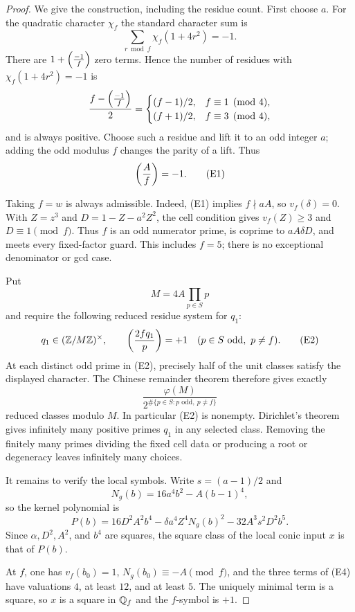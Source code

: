 \begin{proof}
We give the construction, including the residue count.  First choose $a$.
For the quadratic character $\chi_f$ the standard character sum is
\[
 \sum_{r\bmod f}\chi_f(1+4r^2)=-1.
\]
There are \(1+\left(\frac{-1}{f}\right)\) zero terms.  Hence the number of residues
with $\chi_f(1+4r^2)=-1$ is
\[
 \frac{f-\left(\frac{-1}{f}\right)}{2}
 =
 \begin{cases}
 (f-1)/2,&f\equiv1\pmod4,\\
 (f+1)/2,&f\equiv3\pmod4,
 \end{cases}
\]
and is always positive.  Choose such a residue and lift it to an odd
integer $a$; adding the odd modulus $f$ changes the parity of a lift.  Thus
\[
 \left(\frac{A}{f}\right)=-1. \tag{E1}
\]

Taking $f=w$ is always admissible.  Indeed, (E1) implies
$f\nmid aA$, so $v_f(\delta)=0$.  With $Z=z^3$ and
$D=1-Z-a^2Z^2$, the cell condition gives $v_f(Z)\geq3$ and
$D\equiv1\pmod f$.  Thus $f$ is an odd numerator prime, is coprime to
$aA\delta D$, and meets every fixed-factor guard.  This includes $f=5$;
there is no exceptional denominator or gcd case.

Put
\[
 M=4A\prod_{p\in S}p
\]
and require the following reduced residue system for $q_1$:
\[
 q_1\in(\mathbb{Z}/M\mathbb{Z})^\times,
 \qquad
 \left(\frac{2fq_1}{p}\right)=+1
 \quad(p\in S\text{ odd},\ p\ne f). \tag{E2}
\]
At each distinct odd prime in (E2), precisely half of the unit classes
satisfy the displayed character.  The Chinese remainder theorem therefore
gives exactly
\[
 \frac{\varphi(M)}
 {2^{\#\{p\in S:p\text{ odd},\ p\ne f\}}} \tag{E3}
\]
reduced classes modulo $M$.  In particular (E2) is nonempty.  Dirichlet's
theorem gives infinitely many positive primes $q_1$ in any selected class.
Removing the finitely many primes dividing the fixed cell data or producing
a root or degeneracy leaves infinitely many choices.

It remains to verify the local symbols.  Write $s=(a-1)/2$ and
\[
 N_g(b)=16a^4b^2-A(b-1)^4,
\]
so the kernel polynomial is
\[
 P(b)=16D^2A^2b^4-\delta a^4Z^4N_g(b)^2
      -32A^3s^2D^2b^5. \tag{E4}
\]
Since $\alpha,D^2,A^2$, and $b^4$ are squares, the square class of the
local conic input $x$ is that of $P(b)$.

At $f$, one has $v_f(b_0)=1$, $N_g(b_0)\equiv-A\pmod f$, and the three
terms of (E4) have valuations $4$, at least $12$, and at least $5$.
The uniquely minimal term is a square, so $x$ is a square in $\mathbb{Q}_f$ and
the $f$-symbol is $+1$.


\end{proof}
